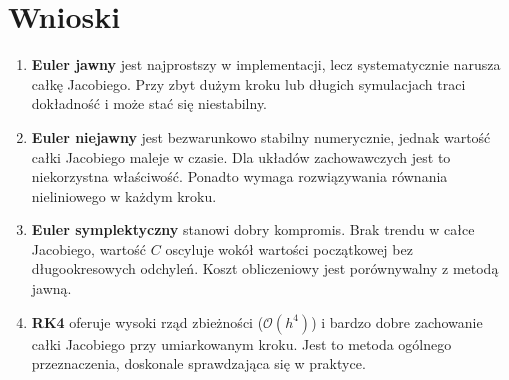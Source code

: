 \documentclass[12pt, a4paper]{article}
\begin{document}
\section{Wnioski}

\begin{enumerate}
  \item \textbf{Euler jawny} jest najprostszy w implementacji, lecz systematycznie narusza całkę Jacobiego. Przy zbyt dużym kroku lub długich symulacjach traci dokładność i może stać się niestabilny.

  \item \textbf{Euler niejawny} jest bezwarunkowo stabilny numerycznie, jednak wartość całki Jacobiego maleje w czasie. Dla układów zachowawczych jest to niekorzystna właściwość. Ponadto wymaga rozwiązywania równania nieliniowego w każdym kroku.

  \item \textbf{Euler symplektyczny} stanowi dobry kompromis. Brak trendu w całce Jacobiego, wartość $C$ oscyluje wokół wartości początkowej bez długookresowych odchyleń. Koszt obliczeniowy jest porównywalny z metodą jawną.

  \item \textbf{RK4} oferuje wysoki rząd zbieżności ($\mathcal{O}(h^4)$) i bardzo dobre zachowanie całki Jacobiego przy umiarkowanym kroku. Jest to metoda ogólnego przeznaczenia, doskonale sprawdzająca się w praktyce.

  \end{enumerate}
\end{document}
